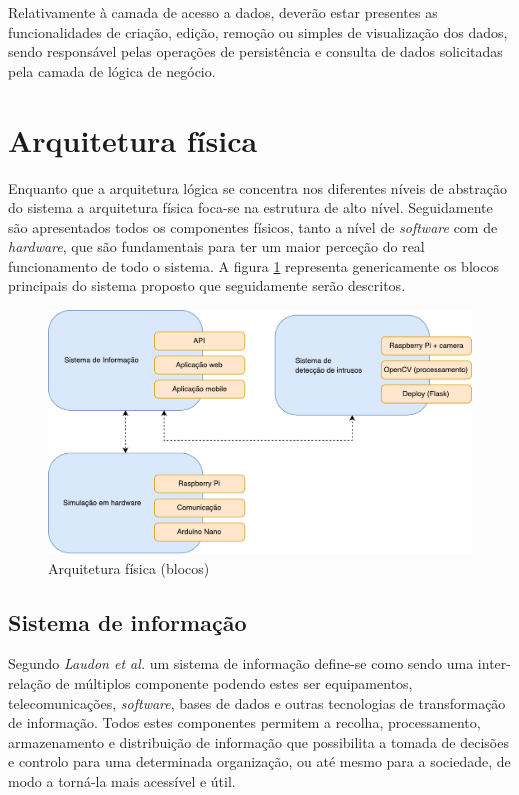 Relativamente à camada de acesso a dados, deverão estar presentes as funcionalidades de criação, edição, remoção ou simples de visualização dos dados, sendo responsável pelas operações de persistência e consulta de dados solicitadas pela camada de lógica de negócio.


\section{Arquitetura física}


Enquanto que a arquitetura lógica se concentra nos diferentes níveis de abstração do sistema a arquitetura física foca-se na estrutura de alto nível.  
Seguidamente são apresentados todos os componentes físicos, tanto  a nível de \textit{software} com de \textit{hardware}, que são fundamentais para ter um maior perceção do real funcionamento de todo o sistema. 
A figura \ref{fisicablocos} representa genericamente os blocos principais do sistema proposto que seguidamente serão descritos. 


\begin{figure}[h]
	\centering
	\includegraphics[scale=0.41]{esquemas/esquema-blocos.pdf}
	\caption{Arquitetura física (blocos)}
	\label{fisicablocos}
\end{figure}


  
\subsection{Sistema de informação}


Segundo \textit{Laudon et al.}\cite{Laudon1998} um sistema de informação define-se como sendo uma inter-relação de múltiplos componente podendo estes ser equipamentos, telecomunicações, \textit{software}, bases de dados e outras tecnologias de transformação de informação. Todos estes componentes permitem a recolha, processamento, armazenamento e distribuição de informação que possibilita a tomada de decisões e controlo para uma determinada organização, ou até mesmo para a sociedade, de modo a torná-la mais acessível e útil.

